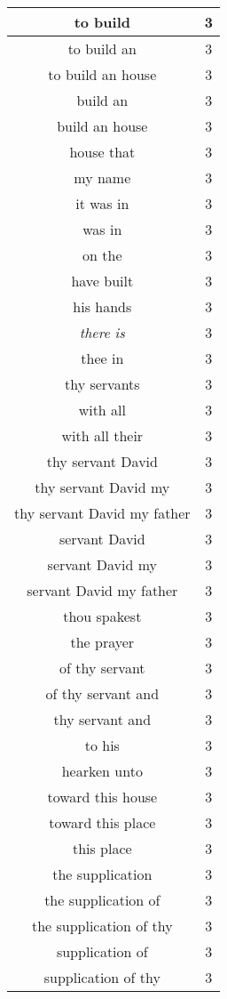 \begin{center}
\begin{longtable}{|c|c|}
to build & 3\\ \hline 
to build an & 3\\ \hline 
to build an house & 3\\ \hline 
build an & 3\\ \hline 
build an house & 3\\ \hline 
house that & 3\\ \hline 
my name & 3\\ \hline 
it was in & 3\\ \hline 
was in & 3\\ \hline 
on the & 3\\ \hline 
have built & 3\\ \hline 
his hands & 3\\ \hline 
\emph{there} \emph{is} & 3\\ \hline 
thee in & 3\\ \hline 
thy servants & 3\\ \hline 
with all & 3\\ \hline 
with all their & 3\\ \hline 
thy servant David & 3\\ \hline 
thy servant David my & 3\\ \hline 
thy servant David my father & 3\\ \hline 
servant David & 3\\ \hline 
servant David my & 3\\ \hline 
servant David my father & 3\\ \hline 
thou spakest & 3\\ \hline 
the prayer & 3\\ \hline 
of thy servant & 3\\ \hline 
of thy servant and & 3\\ \hline 
thy servant and & 3\\ \hline 
to his & 3\\ \hline 
hearken unto & 3\\ \hline 
toward this house & 3\\ \hline 
toward this place & 3\\ \hline 
this place & 3\\ \hline 
the supplication & 3\\ \hline 
the supplication of & 3\\ \hline 
the supplication of thy & 3\\ \hline 
supplication of & 3\\ \hline 
supplication of thy & 3\\ \hline 

\end{longtable}
\end{center}
